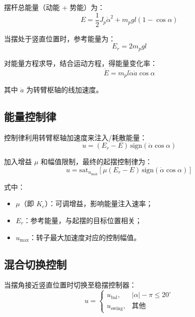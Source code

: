 \documentclass[12pt, a4paper]{article}
\begin{document}
摆杆总能量（动能 + 势能）为：
\begin{equation}
    E = \frac{1}{2}J_p\dot{\alpha}^2 + m_p g l (1 - \cos\alpha)
\end{equation}

当摆处于竖直位置时，参考能量为：
\begin{equation}
    E_r = 2 m_p g l
\end{equation}

对能量方程求导，结合运动方程，得能量变化率：
\begin{equation}
    \dot{E} = m_p l \dot{\alpha} \ddot{a} \cos\alpha
\end{equation}

其中 $\ddot{a}$ 为转臂枢轴的线加速度。

\subsection{能量控制律}

控制律利用转臂枢轴加速度来注入/耗散能量：
\begin{equation}
    u = (E_r - E)\,\text{sign}(\dot{\alpha}\cos\alpha)
    \label{eq:swingup_basic}
\end{equation}

加入增益 $\mu$ 和幅值限制，最终的起摆控制律为：
\begin{equation}
    \boxed{u = \text{sat}_{u_\text{max}}\!\left[\mu(E_r - E)\,\text{sign}(\dot{\alpha}\cos\alpha)\right]}
    \label{eq:swingup}
\end{equation}

式中：
\begin{itemize}
    \item $\mu$（即 $K_e$）：可调增益，影响能量注入速率；
    \item $E_r$：参考能量，与起摆的目标位置相关；
    \item $u_\text{max}$：转子最大加速度对应的控制幅值。
\end{itemize}

\subsection{混合切换控制}

当摆角接近竖直位置时切换至稳摆控制器：
\begin{equation}
    u = \begin{cases}
        u_\text{bal}, & |\alpha| - \pi \leq 20^\circ \\
        u_\text{swing}, & \text{其他}
    \end{cases}
\end{equation}
\end{document}
